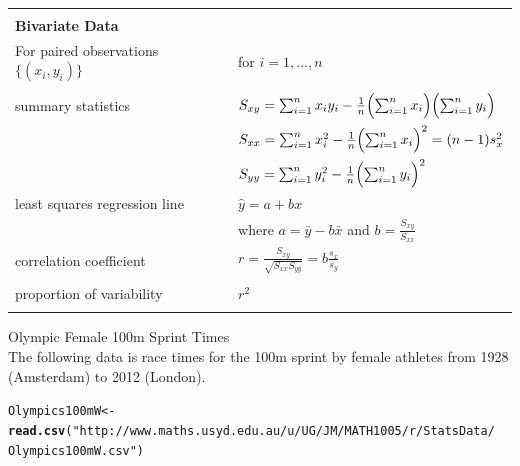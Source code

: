 \documentclass[bigtut]{tutorial}\usepackage[]{graphicx}\usepackage[]{color}
\makeatletter
\newcommand{\hlstr}[1]{\textcolor[rgb]{0.192,0.494,0.8}{#1}}%
\newcommand{\hlstd}[1]{\textcolor[rgb]{0.345,0.345,0.345}{#1}}%
\newcommand{\hlkwb}[1]{\textcolor[rgb]{0.69,0.353,0.396}{#1}}%
\newcommand{\hlkwd}[1]{\textcolor[rgb]{0.737,0.353,0.396}{\textbf{#1}}}%
\newenvironment{kframe}{%
 \def\at@end@of@kframe{}%
 \ifinner\ifhmode%
  \def\at@end@of@kframe{\end{minipage}}%
  \begin{minipage}{\columnwidth}%
 \fi\fi%
 \def\FrameCommand##1{\hskip\@totalleftmargin \hskip-\fboxsep
 \colorbox{shadecolor}{##1}\hskip-\fboxsep
     \hskip-\linewidth \hskip-\@totalleftmargin \hskip\columnwidth}%
 \MakeFramed {\advance\hsize-\width
   \@totalleftmargin\z@ \linewidth\hsize
   \@setminipage}}%
 {\par\unskip\endMakeFramed%
 \at@end@of@kframe}
\newenvironment{knitrout}{}{} %
\makeatother
\begin{document}

\begin{tutorial}


\begin{center}
\begin{tabular}{| ll |} \hline
& \\
{\bf Bivariate Data} & \\
For paired observations $\{ (x_i,y_i) \}$  & for $i=1,\ldots,n$ \\
& \\
summary statistics &   $S_{xy} = \sum_{i=1}^n x_iy_i -  \frac{1}{n} \Bigl( \sum_{i=1}^nx_i \Bigr)  \Bigl( \sum_{i=1}^ny_i\Bigr) $    \\
& $S_{xx} = \sum_{i=1}^n x_i^2 - \frac{1}{n} \Bigl(\sum_{i=1}^n x_i\Bigr)^2  = (n-1)s_{x}^2$       \\ 
& $S_{yy} = \sum_{i=1}^n y_i^2 - \frac{1}{n} \Bigl(\sum_{i=1}^n y_i\Bigr)^2$  \\
least squares regression line & $\hat{y}=a + bx$ \\
& where $a =\bar y - b \bar x$ and $b =\frac{S_{xy}}{S_{xx}}$ \\
correlation coefficient &  $r =\frac{S_{xy}}{\sqrt{S_{xx}S_{yy}}} = b \frac{s_x}{s_y}$ \\ 
& \\ 
proportion of variability &  $r^2$ \\ 
& \\ \hline
\end{tabular}
\end{center}

\vspace{.5cm}
\begin{questions}


\question Olympic Female 100m Sprint Times \\

The following data is race times for the 100m sprint by female athletes from 1928 (Amsterdam) to 2012 (London).

\begin{knitrout}
\color{fgcolor}\begin{kframe}
\begin{alltt}
\hlstd{Olympics100mW} \hlkwb{<-} \hlkwd{read.csv}\hlstd{(}\hlstr{"http://www.maths.usyd.edu.au/u/UG/JM/MATH1005/r/StatsData/
                          Olympics100mW.csv"}\hlstd{)}
\end{alltt}
\end{kframe}
\end{knitrout}


\end{questions}
\end{tutorial}
\end{document}
